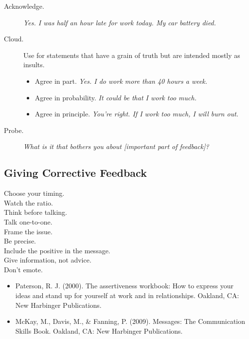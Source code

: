\documentclass{article}
\begin{document}
\begin{tiny}
\begin{multicols}{3}
\begin{tcolorbox}[breakable,colback=rainbow3]
\begin{description}
            \item[Acknowledge.] \emph{Yes. I was half an hour late for work today. My car battery died.}
            \item[Cloud.] Use for statements that have a grain of truth but are intended mostly as insults.
              \begin{itemize}
                 \item Agree in part. \emph{Yes. I do work more than 40 hours a week.}
                 \item Agree in probability. \emph{It could be that I work too much.}
                 \item Agree in principle. \emph{You're right. If I work too much, I will burn out.}
              \end{itemize}
            \item[Probe.] \emph{What is it that bothers you about [important part of feedback]?}
         \end{description}

    \end{tcolorbox}
 
    \begin{tcolorbox}[breakable,colback=rainbow4]

	\section*{Giving Corrective Feedback}

        \begin{description}
            \item[Choose your timing.]
            \item[Watch the ratio.]
            \item[Think before talking.]
            \item[Talk one-to-one.]
            \item[Frame the issue.]
            \item[Be precise.]
            \item[Include the positive in the message.]
            \item[Give information, not advice.]
            \item[Don't emote.]
        \end{description}

    \end{tcolorbox}

\end{multicols}

\begin{itemize}
    \item Paterson, R. J. (2000). The assertiveness workbook: How to express your ideas and stand up for yourself at work and in relationships. Oakland, CA: New Harbinger Publications.
    \item McKay, M., Davis, M., \& Fanning, P. (2009). Messages: The Communication Skills Book. Oakland, CA: New Harbinger Publications.
\end{itemize}

\end{tiny}
\end{document}
